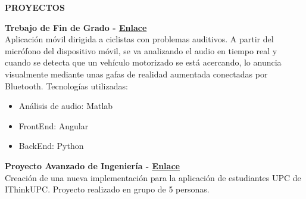 \documentclass[../main.tex]{subfiles}
\begin{document}
    \textbf{\textcolor{myCV2}{PROYECTOS\underline{\hspace{15.43cm}}}}
    \vspace*{0.3cm}
    
    \textbf{Trebajo de Fin de Grado - 
        \hspace*{0.07cm}
        \textcolor{myCV2}{
        \vspace*{0.1cm}\underline{\href{https://www.youtube.com/watch?v=WKyUsdZbQ0Y}{Enlace}}}}\\
        Aplicación móvil dirigida a ciclistas con problemas auditivos. A partir del micrófono del dispositivo móvil, se va analizando el audio en tiempo real y cuando se detecta que un vehículo motorizado se está acercando, lo anuncia visualmente mediante unas gafas de realidad aumentada conectadas por Bluetooth. Tecnologías utilizadas:
        \begin{itemize}
            \vspace*{-0.2cm}
            \item Análisis de audio: Matlab
            \vspace*{-0.2cm}
            \item FrontEnd: Angular
            \vspace*{-0.2cm}
            \item BackEnd: Python
        \end {itemize}
        
        \textbf{Proyecto Avanzado de Ingeniería - 
         \hspace*{0.07cm}
         \textcolor{myCV2}{
        \vspace*{0.1cm}\underline{\href{https://www.youtube.com/watch?v=RrfiOulhY-E&t=7s}{Enlace}}}}\\
        Creación de una nueva implementación para la aplicación de estudiantes UPC de IThinkUPC. Proyecto realizado en grupo de 5 personas.

        
\end{document}
